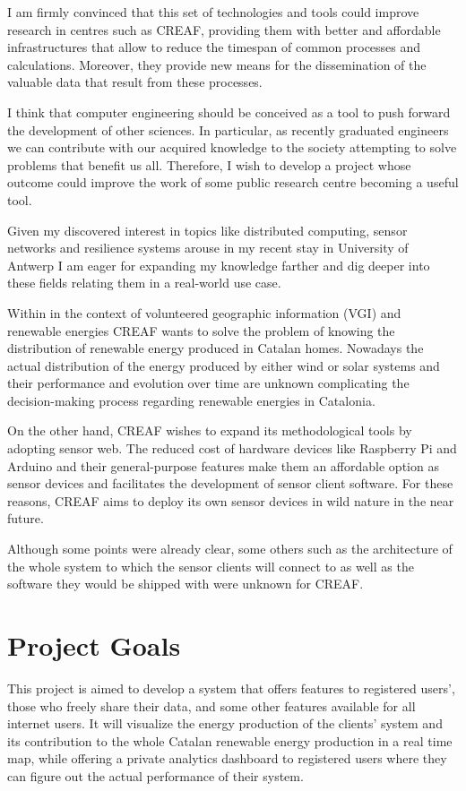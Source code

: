 I am firmly convinced that this set of technologies and tools could improve research in centres such as CREAF, providing them with better and affordable infrastructures that allow to reduce the timespan of common processes and calculations. Moreover, they provide new means for the dissemination of the valuable data that result from these processes.

I think that computer engineering should be conceived as a tool to push forward the development of other sciences. In particular, as recently graduated engineers we can contribute with our acquired knowledge to the society attempting to solve problems that benefit us all. Therefore, I wish to develop a project whose outcome could improve the work of some public research centre becoming a useful tool.

Given my discovered interest in topics like distributed computing, sensor networks and resilience systems arouse in my recent stay in University of Antwerp I am eager for expanding my knowledge farther and dig deeper into these fields relating them in a real-world use case.

Within in the context of volunteered geographic information (VGI) and renewable energies CREAF wants to solve the problem of knowing the distribution of renewable energy produced in Catalan homes. Nowadays the actual distribution of the energy produced by either wind or solar systems and their performance and evolution over time are unknown complicating the decision-making process regarding renewable energies in Catalonia.

On the other hand, CREAF wishes to expand its methodological tools by adopting sensor web. The reduced cost of hardware devices like Raspberry Pi and Arduino  and their general-purpose features make them an affordable option as sensor devices and facilitates the development of sensor client software. For these reasons, CREAF aims to deploy its own sensor devices in wild nature in the near future. 

Although some points were already clear, some others such as the architecture of the whole system to which the sensor clients will connect to as well as the software they would be shipped with were unknown for CREAF.

\section{Project Goals}

This project is aimed to develop a system that offers features to registered users’, those who freely share their data, and some other features available for all internet users. It will visualize the energy production of the clients’ system and its contribution to the whole Catalan renewable energy production in a real time map, while offering a private analytics dashboard to registered users where they can figure out the actual performance of their system.

